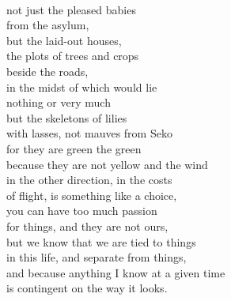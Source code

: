 \documentclass[smalldemyvopaper,11pt,twoside,onecolumn,openright,extrafontsizes]{memoir}
\begin{document}
\\not just the pleased babies
\\from the asylum,
\\but the laid-out houses,
\\the plots of trees and crops
\\beside the roads,
\\in the midst of which would lie
\\nothing or very much
\\but the skeletons of lilies
\\with lasses, not mauves from Seko
\\for they are green the green
\\because they are not yellow and the wind
\\in the other direction, in the costs
\\of flight, is something like a choice,
\\you can have too much passion
\\for things, and they are not ours,
\\but we know that we are tied to things
\\in this life, and separate from things,
\\and because anything I know at a given time
\\is contingent on the way it looks.
\end{document}
